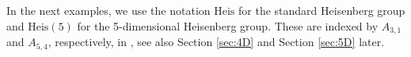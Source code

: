 \documentclass[a4paper,12pt]{amsart}
\newcommand{\pp}{\mathrm}
\newcommand{\matriisi}[2]{\left [\begin{array}{#1} #2 \end{array} \right]}
\theoremstyle{plain}
\theoremstyle{definition}
\newtheorem{Esim}[maar]{Example}
\theoremstyle{plain}
\theoremstyle{remark}
\begin{document}
In the next examples, we use the notation \( \pp{Heis} \) for the standard Heisenberg group
and \( \pp{Heis}(5) \) for the 5-dimensional Heisenberg group. These are indexed by \( A_{3,1} \)
and \( A_{5,4} \), respectively, in \cite{avain:Patera}, see also Section \ref{sec:4D} and Section \ref{sec:5D} later.

\end{document}
